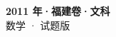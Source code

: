\documentclass[zihao=-4, a4paper]{ctexart}
\begin{document}
\begin{center}
  {\Large\bfseries 2011 年·福建卷·文科}\\[4pt]
  {\large 数学 · 试题版}
\end{center}
\medskip
{}

\end{document}
